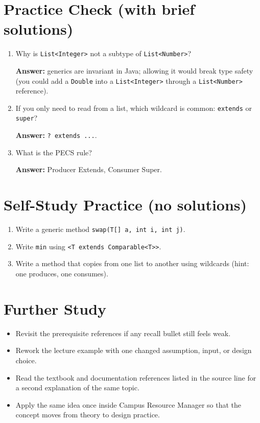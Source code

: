 \documentclass[11pt]{article}
\begin{document}
\section{Practice Check (with brief solutions)}
\begin{enumerate}
  \item Why is \texttt{List<Integer>} not a subtype of \texttt{List<Number>}?\par
  \textbf{Answer:} generics are invariant in Java; allowing it would break type safety (you could add a \texttt{Double} into a \texttt{List<Integer>} through a \texttt{List<Number>} reference).

  \item If you only need to read from a list, which wildcard is common: \texttt{extends} or \texttt{super}?\par
  \textbf{Answer:} \texttt{? extends ...}.

  \item What is the PECS rule?\par
  \textbf{Answer:} Producer Extends, Consumer Super.
\end{enumerate}

\section{Self-Study Practice (no solutions)}
\begin{enumerate}
  \item Write a generic method \texttt{swap(T[] a, int i, int j)}.
  \item Write \texttt{min} using \texttt{<T extends Comparable<T>>}.
  \item Write a method that copies from one list to another using wildcards (hint: one produces, one consumes).
\end{enumerate}

\section{Further Study}
\begin{itemize}
  \item Revisit the prerequisite references if any recall bullet still feels weak.
  \item Rework the lecture example with one changed assumption, input, or design choice.
  \item Read the textbook and documentation references listed in the source line for a second explanation of the same topic.
  \item Apply the same idea once inside Campus Resource Manager so that the concept moves from theory to design practice.
\end{itemize}
\notesources{\OOPSUnitIVSources}
\end{document}
